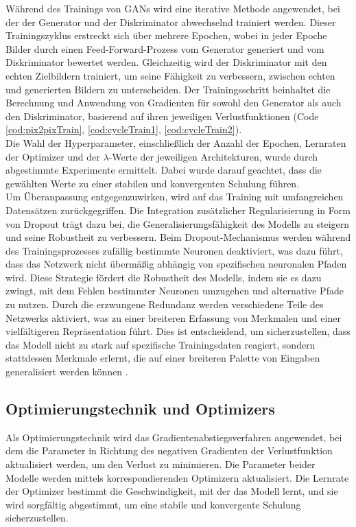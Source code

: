 Während des Trainings von GANs wird eine iterative Methode angewendet, bei der der Generator und der Diskriminator abwechselnd trainiert werden. Dieser Trainingszyklus erstreckt sich über mehrere Epochen, wobei in jeder Epoche Bilder durch einen Feed-Forward-Prozess vom Generator generiert und vom Diskriminator bewertet werden. Gleichzeitig wird der Diskriminator mit den echten Zielbildern trainiert, um seine Fähigkeit zu verbessern, zwischen echten und generierten Bildern zu unterscheiden. Der Trainingsschritt beinhaltet die Berechnung und Anwendung von Gradienten für sowohl den Generator als auch den Diskriminator, basierend auf ihren jeweiligen Verlustfunktionen (Code \ref{cod:pix2pixTrain}, \ref{cod:cycleTrain1}, \ref{cod:cycleTrain2}).
\\\newline
Die Wahl der Hyperparameter, einschließlich der Anzahl der Epochen, Lernraten der Optimizer und der $\lambda$-Werte der jeweiligen Architekturen, wurde durch abgestimmte Experimente ermittelt. Dabei wurde darauf geachtet, dass die gewählten Werte zu einer stabilen und konvergenten Schulung führen.
\\\newline
Um Überanpassung entgegenzuwirken, wird auf das Training mit umfangreichen Datensätzen zurückgegriffen. Die Integration zusätzlicher Regularisierung in Form von Dropout trägt dazu bei, die Generalisierungsfähigkeit des Modells zu steigern und seine Robustheit zu verbessern. Beim Dropout-Mechanismus werden während des Trainingsprozesses zufällig bestimmte Neuronen deaktiviert, was dazu führt, dass das Netzwerk nicht übermäßig abhängig von spezifischen neuronalen Pfaden wird. Diese Strategie fördert die Robustheit des Modells, indem sie es dazu zwingt, mit dem Fehlen bestimmter Neuronen umzugehen und alternative Pfade zu nutzen. Durch die erzwungene Redundanz werden verschiedene Teile des Netzwerks aktiviert, was zu einer breiteren Erfassung von Merkmalen und einer vielfältigeren Repräsentation führt. Dies ist entscheidend, um sicherzustellen, dass das Modell nicht zu stark auf spezifische Trainingsdaten reagiert, sondern stattdessen Merkmale erlernt, die auf einer breiteren Palette von Eingaben generalisiert werden können \cite{Yamashita.2018}. 

\subsection{Optimierungstechnik und Optimizers}
Als Optimierungstechnik wird das Gradientenabstiegsverfahren angewendet, bei dem die Parameter in Richtung des negativen Gradienten der Verlustfunktion aktualisiert werden, um den Verlust zu minimieren. Die Parameter beider Modelle werden mittels korrespondierenden Optimizern aktualisiert. Die Lernrate der Optimizer bestimmt die Geschwindigkeit, mit der das Modell lernt, und sie wird sorgfältig abgestimmt, um eine stabile und konvergente Schulung sicherzustellen.

